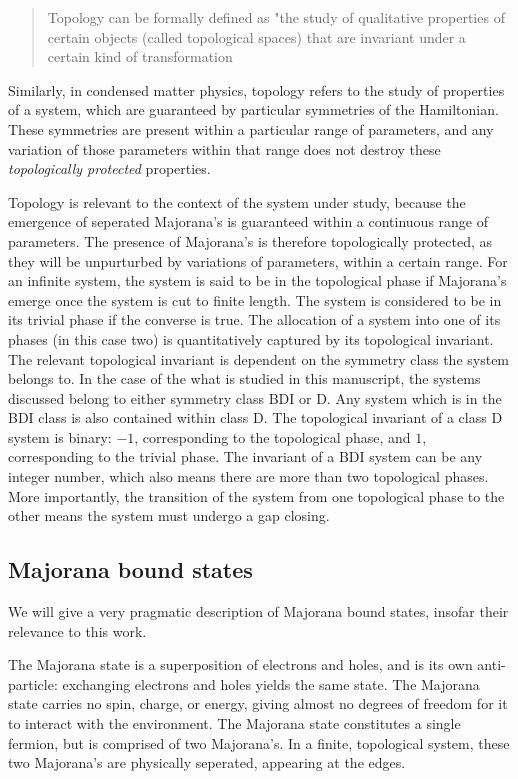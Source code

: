 	\begin{quote}Topology can be formally defined as "the study of qualitative properties of certain objects (called topological spaces) that are invariant under a certain kind of transformation
	\cite{noauthor_topology_2018}
	\end{quote}

	Similarly, in condensed matter physics, topology refers to the study of properties of a system, which are guaranteed by particular symmetries of the Hamiltonian.
	These symmetries are present within a particular range of parameters, and any variation of those parameters within that range does not destroy these \emph{topologically protected} properties.
	
	Topology is relevant to the context of the system under study, because the emergence of seperated Majorana's is guaranteed within a continuous range of parameters.
	The presence of Majorana's is therefore topologically protected, as they will be unpurturbed by variations of parameters, within a certain range.
	For an infinite system, the system is said to be in the topological phase if Majorana's emerge once the system is cut to finite length.
	The system is considered to be in its trivial phase if the converse is true.
	The allocation of a system into one of its phases (in this case two) is quantitatively captured by its topological invariant.
	The relevant topological invariant is dependent on the symmetry class the system belongs to.
	In the case of the what is studied in this manuscript, the systems discussed belong to either symmetry class BDI or D.
	Any system which is in the BDI class is also contained within class D.
	The topological invariant of a class D system is binary: $-1$, corresponding to the topological phase, and $1$, corresponding to the trivial phase.
	The invariant of a BDI system can be any integer number, which also means there are more than two topological phases.
	More importantly, the transition of the system from one topological phase to the other means the system must undergo a gap closing.


	\subsection{Majorana bound states}
		We will give a very pragmatic description of Majorana bound states, insofar their relevance to this work.

		The Majorana state is a superposition of electrons and holes, and is its own anti-particle: exchanging electrons and holes yields the same state.
		The Majorana state carries no spin, charge, or energy, giving almost no degrees of freedom for it to interact with the environment.
		The Majorana state constitutes a single fermion, but is comprised of two Majorana's.
		In a finite, topological system, these two Majorana's are physically seperated, appearing at the edges.

